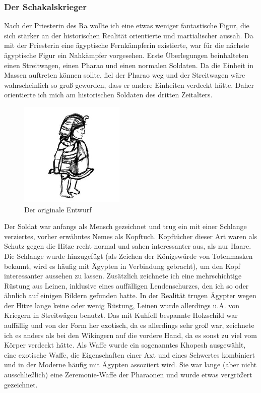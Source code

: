 \documentclass[extern,palatino]{cgBA}
\begin{document}
\subsubsection{Der Schakalskrieger}
Nach der Priesterin des Ra wollte ich eine etwas weniger fantastische Figur, die sich stärker an der historischen Realität orientierte und martialischer aussah. Da mit der Priesterin eine ägyptische Fernkämpferin existierte, war für die nächste ägyptische Figur ein Nahkämpfer vorgesehen. Erste Überlegungen beinhalteten einen Streitwagen, einen Pharao und einen normalen Soldaten. Da die Einheit in Massen auftreten können sollte, fiel der Pharao weg und der Streitwagen wäre wahrscheinlich so groß geworden, dass er andere Einheiten verdeckt hätte. Daher orientierte ich mich am historischen Soldaten des dritten Zeitalters.
\begin{figure}[H]
	\centering
	\includegraphics[height=5cm]{jackalalpha.jpg}
	\caption{Der originale Entwurf}
	\label{jackalalpha
	}
\end{figure} 
Der Soldat war anfangs als Mensch gezeichnet und trug ein mit einer Schlange verziertes, vorher erwähntes Nemes als Kopftuch. Kopftücher dieser Art waren als Schutz gegen die Hitze recht normal und sahen interessanter aus, als nur Haare. Die Schlange wurde hinzugefügt (als Zeichen der Königswürde von Totenmasken bekannt, wird es häufig mit Ägypten in Verbindung gebracht), um den Kopf interessanter aussehen zu lassen. Zusätzlich zeichnete ich eine mehrschichtige Rüstung aus Leinen, inklusive eines auffälligen Lendenschurzes, den ich so oder ähnlich auf einigen Bildern gefunden hatte. In der Realität trugen Ägypter wegen der Hitze lange keine oder wenig Rüstung, Leinen wurde allerdings u.A. von Kriegern in Streitwägen benutzt. Das mit Kuhfell bespannte Holzschild war auffällig und von der Form her exotisch, da es allerdings sehr groß war, zeichnete ich es anders als bei den Wikingern auf die vordere Hand, da es sonst zu viel vom Körper verdeckt hätte. Als Waffe wurde ein sogenanntes Khopesh ausgewählt, eine exotische Waffe, die Eigenschaften einer Axt und eines Schwertes kombiniert und in der Moderne häufig mit Ägypten assoziiert wird. Sie war lange (aber nicht ausschließlich) eine Zeremonie-Waffe der Pharaonen und wurde etwas vergrößert gezeichnet. 
\end{document}
